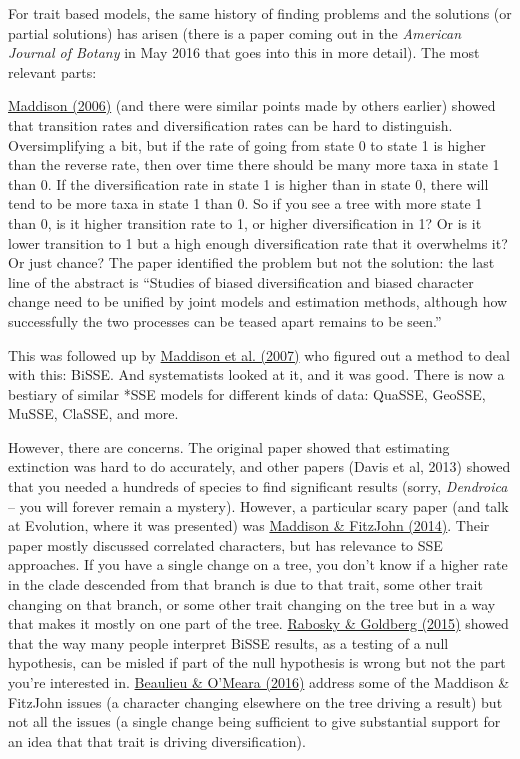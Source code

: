 \documentclass[]{article}
\theoremstyle{definition}
\theoremstyle{definition}
\theoremstyle{definition}
\theoremstyle{remark}
\begin{document}
For trait based models, the same history of finding problems and the
solutions (or partial solutions) has arisen (there is a paper coming out
in the \emph{American Journal of Botany} in May 2016 that goes into this
in more detail). The most relevant parts:

\href{http://onlinelibrary.wiley.com/doi/10.1111/j.0014-3820.2006.tb00517.x/abstract}{Maddison
(2006)} (and there were similar points made by others earlier) showed
that transition rates and diversification rates can be hard to
distinguish. Oversimplifying a bit, but if the rate of going from state
0 to state 1 is higher than the reverse rate, then over time there
should be many more taxa in state 1 than 0. If the diversification rate
in state 1 is higher than in state 0, there will tend to be more taxa in
state 1 than 0. So if you see a tree with more state 1 than 0, is it
higher transition rate to 1, or higher diversification in 1? Or is it
lower transition to 1 but a high enough diversification rate that it
overwhelms it? Or just chance? The paper identified the problem but not
the solution: the last line of the abstract is ``Studies of biased
diversification and biased character change need to be unified by joint
models and estimation methods, although how successfully the two
processes can be teased apart remains to be seen.''

This was followed up by
\href{http://sysbio.oxfordjournals.org/content/56/5/701.short}{Maddison
et al. (2007)} who figured out a method to deal with this: BiSSE. And
systematists looked at it, and it was good. There is now a bestiary of
similar *SSE models for different kinds of data: QuaSSE, GeoSSE, MuSSE,
ClaSSE, and more.

However, there are concerns. The original paper showed that estimating
extinction was hard to do accurately, and other papers (Davis et al,
2013) showed that you needed a hundreds of species to find significant
results (sorry, \emph{Dendroica} -- you will forever remain a mystery).
However, a particular scary paper (and talk at Evolution, where it was
presented) was
\href{https://sysbio.oxfordjournals.org/content/early/2014/10/23/sysbio.syu070.full}{Maddison
\& FitzJohn (2014)}. Their paper mostly discussed correlated characters,
but has relevance to SSE approaches. If you have a single change on a
tree, you don't know if a higher rate in the clade descended from that
branch is due to that trait, some other trait changing on that branch,
or some other trait changing on the tree but in a way that makes it
mostly on one part of the tree.
\href{http://sysbio.oxfordjournals.org/content/early/2015/01/18/sysbio.syu131}{Rabosky
\& Goldberg (2015)} showed that the way many people interpret BiSSE
results, as a testing of a null hypothesis, can be misled if part of the
null hypothesis is wrong but not the part you're interested in.
\href{http://sysbio.oxfordjournals.org/content/early/2016/03/25/sysbio.syw022.abstract}{Beaulieu
\& O'Meara (2016)} address some of the Maddison \& FitzJohn issues (a
character changing elsewhere on the tree driving a result) but not all
the issues (a single change being sufficient to give substantial support
for an idea that that trait is driving diversification).
\end{document}
